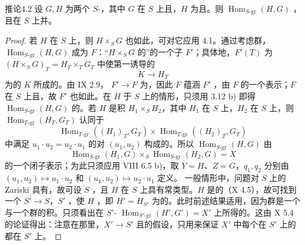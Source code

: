 \begin{SGAresult}{推论}{4.2}
设 $G,H$ 为两个 $S$-，其中 $G$ 在 $S$ 上且，$H$ 为且。则 $\operatorname{Hom}_{S\text{-gr}}(H,G)$ ，且在 $S$ 上并。
\end{SGAresult}
\begin{proof}
若 $H$ 在 $S$ 上，则 $H\times_S G$ 也如此，可对它应用 4.1。通过考虑群，$\operatorname{Hom}_{S\text{-gr}}(H,G)$ 成为 $F$：“$H\times_S G$ 的”的一个子 $F'$；具体地，$F'(T)$ 为 $(H\times_S G)_T=H_T\times_T G_T$ 中使第一诱导的
\[K\longrightarrow H_T\]
为的 $K$ 所成的。由 IX 2.9， $F'\to F$ 为，因此 $F$ 蕴涵 $F'$ ，由 $F$ 的一个表示；$F$ 在 $S$ 上且，故 $F'$ 也如此。在 $H$ 于 $S$ 上的情形，只须用 3.12 b) 即得 $\operatorname{Hom}_{S\text{-gr}}(H,G)$ 的。若 $H$ 是积 $H_1\times_S H_2$，其中 $H_1$ 在 $S$ 上，$H_2$ 在 $S$ 上，则 $\operatorname{Hom}_{T\text{-gr}}(H_T,G_T)$ 认同于
\[\operatorname{Hom}_{T\text{-gr}}((H_1)_T,G_T)\times\operatorname{Hom}_{T\text{-gr}}((H_2)_T,G_T)\]
中满足 $u_1\cdot u_2=u_2\cdot u_1$ 的对 $(u_1,u_2)$ 构成的。所以 $\operatorname{Hom}_{S\text{-gr}}(H,G)$ 由
\[\operatorname{Hom}_{S\text{-gr}}(H_1,G)\times_S\operatorname{Hom}_{S\text{-gr}}(H_2,G)=X\]
的一个闭子表示；为此只须应用 VIII 6.5 b)，取 $Y=H$、$Z=G$，$q_1,q_2$ 分别由 $(u_1,u_2)\mapsto u_1\cdot u_2$ 和 $(u_1,u_2)\mapsto u_2\cdot u_1$ 定义。
一般情形中，问题对 $S$ 上的 Zariski 具有，故可设 $S$ ，且 $H$ 在 $S$ 上具有常类型。$H$ 是的（X 4.5），故可找到一个 $S'\to S$，$S'$ ，使 $H$ ，即 $H'=H_{S'}$ 为的。此时前述结果适用，因为群是一个与一个群的积。只须看出在 $S'$- $\operatorname{Hom}_{S'\text{-gr}}(H',G')=X'$ 上所得的。这由 X 5.4 的论证得出：注意在那里，$X'\to S'$ 且的假设，只用来保证 $X'$ 中每个在 $S'$ 上的都在 $S'$ 上。

\end{proof}
